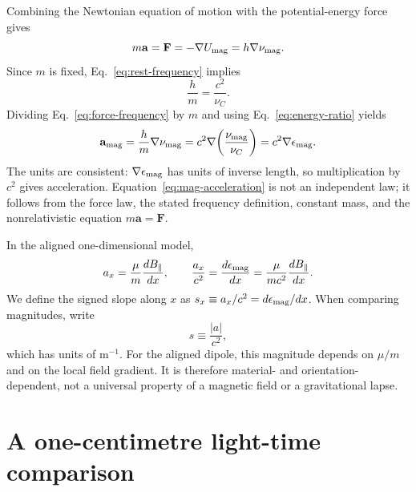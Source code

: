 \documentclass[12pt]{article}
\begin{document}
Combining the Newtonian equation of motion with the potential-energy force gives
\begin{equation}
  m\mathbf a
  =\mathbf F
  =-\nabla U_{\rm mag}
  =h\nabla\nu_{\rm mag}.
  \label{eq:force-frequency}
\end{equation}
Since $m$ is fixed, Eq.~\eqref{eq:rest-frequency} implies
\begin{equation}
  \frac{h}{m}=\frac{c^2}{\nu_C}.
  \label{eq:h-over-m}
\end{equation}
Dividing Eq.~\eqref{eq:force-frequency} by $m$ and using Eq.~\eqref{eq:energy-ratio} yields
\begin{equation}
  \mathbf a_{\rm mag}
  =\frac{h}{m}\nabla\nu_{\rm mag}
  =c^2\nabla\!\left(\frac{\nu_{\rm mag}}{\nu_C}\right)
  =c^2\nabla\epsilon_{\rm mag}.
  \label{eq:mag-acceleration}
\end{equation}
The units are consistent: $\nabla\epsilon_{\rm mag}$ has units of inverse length, so multiplication by $c^2$ gives acceleration. Equation~\eqref{eq:mag-acceleration} is not an independent law; it follows from the force law, the stated frequency definition, constant mass, and the nonrelativistic equation $m\mathbf a=\mathbf F$.

In the aligned one-dimensional model,
\begin{equation}
  a_x=\frac{\mu}{m}\frac{dB_{\parallel}}{dx},
  \qquad
  \frac{a_x}{c^2}=\frac{d\epsilon_{\rm mag}}{dx}
    =\frac{\mu}{mc^2}\frac{dB_{\parallel}}{dx}.
  \label{eq:one-dimensional-acceleration}
\end{equation}
We define the signed slope along $x$ as $s_x\equiv a_x/c^2=d\epsilon_{\rm mag}/dx$. When comparing magnitudes, write
\begin{equation}
  s\equiv\frac{|a|}{c^2},
  \label{eq:slope-magnitude}
\end{equation}
which has units of $\mathrm{m^{-1}}$. For the aligned dipole, this magnitude depends on $\mu/m$ and on the local field gradient. It is therefore material- and orientation-dependent, not a universal property of a magnetic field or a gravitational lapse.

\section{A one-centimetre light-time comparison}
\label{sec:length-time}
\end{document}
